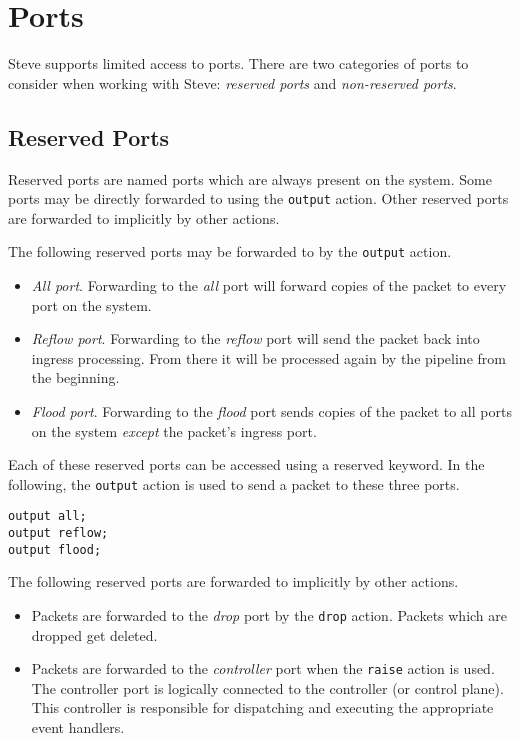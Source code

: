 \section{Ports} \label{tut:ports}

Steve supports limited access to ports.
There are two categories of ports to consider when working with Steve: 
\textit{reserved ports} and
\textit{non-reserved ports}.

\subsection {Reserved Ports} \label{tut:reserved_ports}

Reserved ports are named ports which are always present on the system. Some ports may
be directly forwarded to using the \texttt{output} action. Other reserved ports 
are forwarded to implicitly by other actions.

The following reserved ports may be forwarded to by the \texttt{output} action.

\begin{itemize}
\item \emph{All port}. Forwarding to the \textit{all} port will forward copies of the packet to
every port on the system.

\item \emph{Reflow port}. Forwarding to the \textit{reflow} port will send the packet back into
ingress processing. From there it will be processed again by the pipeline from
the beginning.

\item \emph{Flood port}. Forwarding to the \textit{flood} port sends copies of the packet to all
ports on the system \textit{except} the packet's ingress port.
\end{itemize}

Each of these reserved ports can be accessed using a reserved keyword. In the
following, the \texttt{output} action is used to send a packet to these three
ports.

\begin{codepage}
\begin{lstlisting}
output all;
output reflow;
output flood;
\end{lstlisting}
\end{codepage}

The following reserved ports are forwarded to implicitly by other actions.

\begin{itemize}
\item Packets are forwarded to the \textit{drop} port by the \texttt{drop} action.
Packets which are dropped get deleted.

\item Packets are forwarded to the \textit{controller} port when the 
\texttt{raise} action is used.
The controller port is logically connected to the controller (or control plane).
This controller is responsible for dispatching and executing the 
appropriate event handlers.
\end{itemize}

